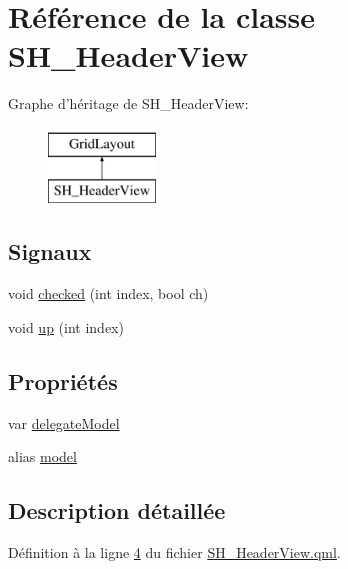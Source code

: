 \hypertarget{classSH__HeaderView}{\section{Référence de la classe S\-H\-\_\-\-Header\-View}
\label{classSH__HeaderView}
}
Graphe d'héritage de S\-H\-\_\-\-Header\-View\-:\begin{figure}[H]
\begin{center}
\leavevmode
\includegraphics[height=2.000000cm]{classSH__HeaderView}
\end{center}
\end{figure}
\subsection*{Signaux}
\begin{DoxyCompactItemize}
\item 
void \hyperlink{classSH__HeaderView_a2611d41d3701c88a2d54d651a7df96e8}{checked} (int index, bool ch)
\item 
void \hyperlink{classSH__HeaderView_a6f5afde99467a14e7ed30b3c9d4f3f81}{up} (int index)
\end{DoxyCompactItemize}
\subsection*{Propriétés}
\begin{DoxyCompactItemize}
\item 
var \hyperlink{classSH__HeaderView_a95ec60701e7213acbe17fdc477feb83c}{delegate\-Model}
\item 
alias \hyperlink{classSH__HeaderView_abf76f87214384e86fb9413047287161d}{model}
\end{DoxyCompactItemize}


\subsection{Description détaillée}


Définition à la ligne \hyperlink{SH__HeaderView_8qml_source_l00004}{4} du fichier \hyperlink{SH__HeaderView_8qml_source}{S\-H\-\_\-\-Header\-View.\-qml}.



